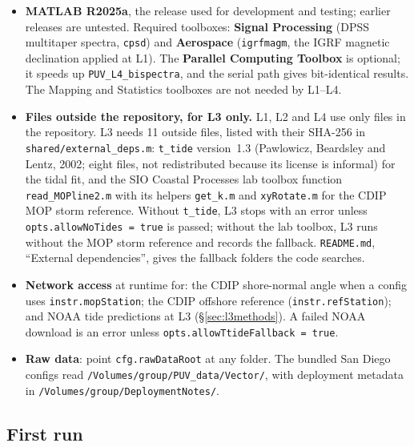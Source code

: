 \documentclass[11pt]{article}
\newcommand{\code}[1]{\texttt{#1}}
\begin{document}
\begin{itemize}
\item \textbf{MATLAB R2025a}, the release used for development and testing; earlier releases
  are untested. Required toolboxes: \textbf{Signal Processing} (DPSS multitaper spectra,
  \code{cpsd}) and \textbf{Aerospace} (\code{igrfmagm}, the IGRF magnetic declination applied
  at L1). The \textbf{Parallel Computing Toolbox} is optional; it speeds up
  \code{PUV\_L4\_bispectra}, and the serial path gives bit-identical results. The Mapping and
  Statistics toolboxes are not needed by L1--L4.
\item \textbf{Files outside the repository, for L3 only.} L1, L2 and L4 use only files in the
  repository. L3 needs 11 outside files, listed with their SHA-256 in
  \code{shared/external\_deps.m}: \code{t\_tide} version~1.3 (Pawlowicz, Beardsley and Lentz,
  2002; eight files, not redistributed because its license is informal) for the tidal fit, and
  the SIO Coastal Processes lab toolbox function \code{read\_MOPline2.m} with its helpers
  \code{get\_k.m} and \code{xyRotate.m} for the CDIP MOP storm reference. Without
  \code{t\_tide}, L3 stops with an error unless \code{opts.allowNoTides = true} is passed;
  without the lab toolbox, L3 runs without the MOP storm reference and records the fallback.
  \code{README.md}, ``External dependencies'', gives the fallback folders the code searches.
\item \textbf{Network access} at runtime for: the CDIP shore-normal angle when a config uses
  \code{instr.mopStation}; the CDIP offshore reference (\code{instr.refStation}); and NOAA tide
  predictions at L3 (\S\ref{sec:l3methods}). A failed NOAA download is an error unless
  \code{opts.allowTtideFallback = true}.
\item \textbf{Raw data}: point \code{cfg.rawDataRoot} at any folder. The bundled San Diego
  configs read \code{/Volumes/group/PUV\_data/Vector/}, with deployment metadata in
  \code{/Volumes/group/DeploymentNotes/}.
\end{itemize}

\subsection{First run}
\end{document}
